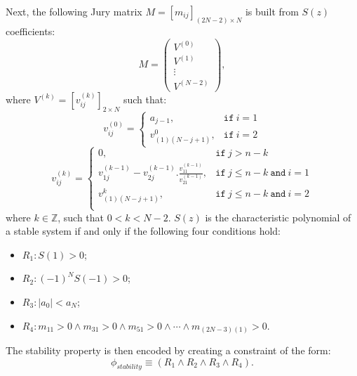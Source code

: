 \documentclass{sig-alternate-05-2015}
\newcommand{\red}[1]{{\color{red}#1}}
\begin{document}

Next, the following Jury matrix
$M = [m_{ij}]_{(2N−2)\times N}$ is built from $S(z)$ coefficients:
%
$$
M=\left( 
\begin{array}{c}
V^{(0)}\\
V^{(1)}\\
\vdots\\
V^{(N-2)}
\end{array}
\right), 
$$
%
where $V^{(k)} = [v^{(k)}_{ij} ]_{2\times N}$ such that:
%
$$
v_{ij}^{(0)}=\left\{
\begin{array}{ll}
a_{j-1}, & \texttt{if}~i=1\\
v_{(1)(N-j+1)}^{0},&\texttt{if}~i=2
\end{array}
\right.
$$
%
$$
v_{ij}^{(k)}=\left\{
\begin{array}{ll}
0,&\texttt{if}~j>n-k\\
v_{1j}^{(k-1)}-v_{2j}^{(k-1)} . \frac{v_{11}^{(k-1)}}{v_{21}^{(k-1)}}, & \texttt{if}~j\leq n-k ~\texttt{and}~i=1\\
v_{(1)(N-j+1)}^{k},& \texttt{if}~j\leq n-k ~\texttt{and}~i=2\\
\end{array}
\right.
$$
%
where $k \in \mathbb{Z}$, such that $0 < k < N - 2$. 
$S(z)$ is the
characteristic polynomial of a stable system if and only if the following four conditions hold:
\begin{itemize}
\item $R_1: S(1) > 0$;
\item $R_2: (−1)^N S(−1) > 0$;
\item $R_3: |a_0| < a_N$;
\item $R_4: m_{11} > 0 \wedge m_{31}>0 \wedge m_{51}>0 \wedge \cdots \wedge m_{(2N{-}3)(1)}>0$.
\end{itemize}

The stability property is then encoded by creating a
constraint of the form:
$$
\phi_\mathit{stability} \equiv (R_1 \wedge R_2 \wedge R_3 \wedge R_4).
$$
\end{document}
